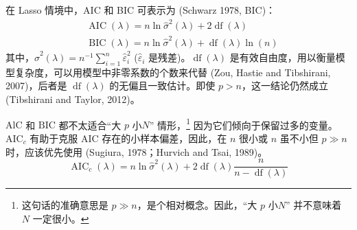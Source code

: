 在 Lasso 情境中，AIC 和 BIC 可表示为 (Schwarz 1978, BIC)：
%
\begin{equation}\label{eq:lasso-aic}
\begin{aligned}
&\operatorname{AIC}(\lambda)=n \ln \widehat{\sigma}^{2}(\lambda)+2 \operatorname{df}(\lambda) \\
&\operatorname{BIC}(\lambda)=n \ln \widehat{\sigma}^{2}(\lambda)+\operatorname{df}(\lambda) \ln (n)
\end{aligned}
\end{equation}
%
其中，$\widehat{\sigma}^{2}(\lambda)=n^{-1} \sum_{i=1}^{n} \widehat{\varepsilon}_{i}^{2}$ ($\widehat{\varepsilon}_{i}$ 是残差)。$\operatorname{df}(\lambda)$ 是有效自由度，用以衡量模型复杂度，可以用模型中非零系数的个数来代替 (Zou, Hastie and Tibshirani, 2007)，后者是 $\operatorname{df}(\lambda)$ 的无偏且一致估计。即使 $p>n$，这一结论仍然成立 (Tibshirani and Taylor, 2012)。

$\mathrm{AlC}$ 和 $\mathrm{BIC}$ 都不太适合“大 $p$ 小$N$” 情形，\footnote{%
  这句话的准确意思是 $p \gg n$，是个相对概念。因此，“大 $p$ 小$N$” 并不意味着 $N$ 一定很小。}
因为它们倾向于保留过多的变量。$\mathrm{AIC}_{c}$ 有助于克服 $\mathrm{AIC}$ 存在的小样本偏差，因此，在 $n$ 很小或 $n$ 虽不小但 $p\gg n$ 时，应该优先使用 (Sugiura, 1978；Hurvich and Tsai, 1989)。
\begin{equation}\label{eq:lasso-aicc}
\operatorname{AIC}_{c}(\lambda)=n \ln \widehat{\sigma}^{2}(\lambda)+2 \operatorname{df}(\lambda) \frac{n}{n-\operatorname{df}(\lambda)}
\end{equation}

